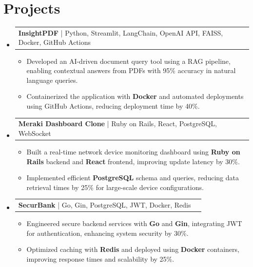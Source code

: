 \documentclass[letterpaper,11pt]{article}
\makeatletter
\newcommand{\resumeItem}[1]{
  \item\footnotesize{
    {#1 \vspace{-2pt}}
  }
}
\newcommand{\resumeProjectHeading}[2]{
    \item
    \begin{tabular*}{1.001\textwidth}{l@{\extracolsep{\fill}}r}
      \small#1 & \textbf{\small #2}\\
    \end{tabular*}\vspace{-7pt}
}
\newcommand{\resumeSubHeadingListStart}{\begin{itemize}[leftmargin=0pt, label={}]}
\newcommand{\resumeSubHeadingListEnd}{\end{itemize}}
\newcommand{\resumeItemListStart}{\begin{itemize}[leftmargin=*]}
\newcommand{\resumeItemListEnd}{\end{itemize}\vspace{-5pt}}
\makeatother
\begin{document}
\section{Projects}
    \vspace{-5pt}
    \resumeSubHeadingListStart

      \resumeProjectHeading
          {\textbf{InsightPDF} | Python, Streamlit, LangChain, OpenAI API, FAISS, Docker, GitHub Actions}{ }
        \resumeItemListStart
            \resumeItem{Developed an AI-driven document query tool using a RAG pipeline, enabling contextual answers from PDFs with 95\% accuracy in natural language queries.}
            \resumeItem{Containerized the application with \textbf{Docker} and automated deployments using GitHub Actions, reducing deployment time by 40\%.}
        \resumeItemListEnd
        \vspace{-12pt}

      \resumeProjectHeading
          {\textbf{Meraki Dashboard Clone} | Ruby on Rails, React, PostgreSQL, WebSocket}{ }
        \resumeItemListStart
            \resumeItem{Built a real-time network device monitoring dashboard using \textbf{Ruby on Rails} backend and \textbf{React} frontend, improving update latency by 30\%.}
            \resumeItem{Implemented efficient \textbf{PostgreSQL} schema and queries, reducing data retrieval times by 25\% for large-scale device configurations.}
        \resumeItemListEnd
        \vspace{-12pt}

      \resumeProjectHeading
          {\textbf{SecurBank} | Go, Gin, PostgreSQL, JWT, Docker, Redis}{ }
        \resumeItemListStart
            \resumeItem{Engineered secure backend services with \textbf{Go} and \textbf{Gin}, integrating JWT for authentication, enhancing system security by 30\%.}
            \resumeItem{Optimized caching with \textbf{Redis} and deployed using \textbf{Docker} containers, improving response times and scalability by 25\%.}
        \resumeItemListEnd

    \resumeSubHeadingListEnd
\end{document}

